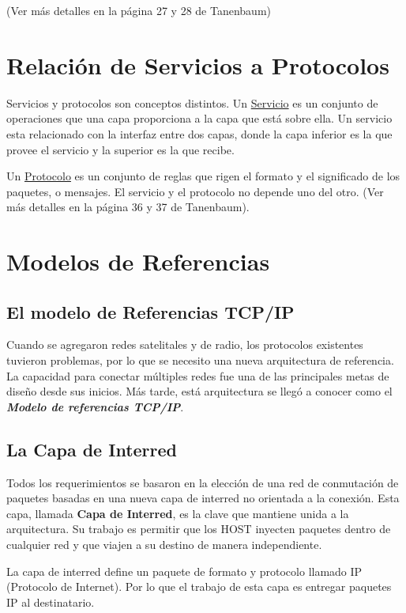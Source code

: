 \documentclass[12pt]{report}
\begin{document}
(Ver  m\'as detalles en la página 27 y 28 de Tanenbaum)

\section*{Relaci\'on de Servicios a Protocolos}

Servicios y protocolos son conceptos distintos. Un \underline {Servicio} es un conjunto de operaciones que una capa proporciona a la capa que est\'a sobre ella. Un servicio esta relacionado con la interfaz entre dos capas, donde la capa inferior es la que provee el servicio y la superior es la que recibe. 

Un \underline {Protocolo} es un conjunto de reglas que rigen el formato y el significado de los paquetes, o mensajes. El servicio y el protocolo no depende uno del otro.
(Ver  m\'as detalles en la p\'agina 36 y 37 de Tanenbaum).

\section*{Modelos de Referencias}
\subsection*{El modelo de Referencias TCP/IP}

Cuando se agregaron redes satelitales y de radio, los protocolos existentes tuvieron problemas, por lo que se necesito una nueva arquitectura de referencia. La capacidad para conectar m\'ultiples redes fue una de las principales metas de dise\~no desde sus inicios. M\'as tarde, est\'a arquitectura se lleg\'o a conocer como el \textit {\bf Modelo de referencias TCP/IP}.

\subsection*{La Capa de Interred}

Todos los requerimientos se basaron en la elecci\'on de una red de conmutaci\'on de paquetes basadas en una nueva capa de interred no orientada a la conexi\'on. Esta capa, llamada {\bf Capa de Interred}, es la clave que mantiene unida a la arquitectura. Su trabajo es permitir que los HOST inyecten paquetes dentro de cualquier red y que viajen a su destino de manera independiente.
 
La capa de interred define un paquete de formato y protocolo llamado IP (Protocolo de Internet). Por lo que el trabajo de esta capa es entregar paquetes IP al destinatario.
\end{document}
